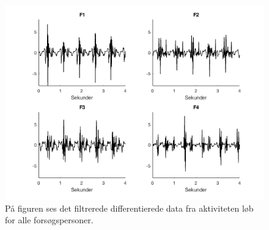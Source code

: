 \begin{figure}[H]
	\centering
	\includegraphics[scale=0.6]{figures/qBilag/loeb_diff}
	\caption{På figuren ses det filtrerede differentierede data fra aktiviteten løb for alle forsøgspersoner.}
	\label{fig:Ap_loebdiff}
\end{figure}\vspace{-.25cm}

